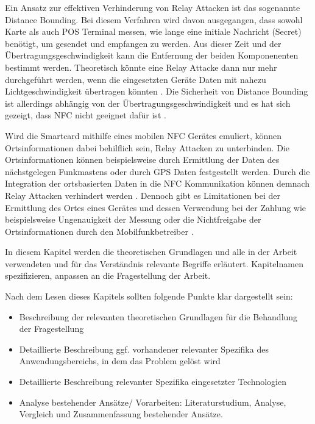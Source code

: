 Ein Ansatz zur effektiven Verhinderung von Relay Attacken ist das sogenannte Distance Bounding. Bei diesem Verfahren wird davon ausgegangen, dass sowohl Karte als auch POS Terminal messen, wie lange eine initiale Nachricht (Secret) benötigt, um gesendet und empfangen zu werden. Aus dieser Zeit und der Übertragungsgeschwindigkeit kann die Entfernung der beiden Komponenenten bestimmt werden. Theoretisch könnte eine Relay Attacke dann nur mehr durchgeführt werden, wenn die eingesetzten Geräte Daten mit nahezu Lichtgeschwindigkeit übertragen könnten \cite{nfcRelayWithOffTheShelfHardAndSoftware}. Die Sicherheit von Distance Bounding ist allerdings abhängig von der Übertragungsgeschwindigkeit und es hat sich gezeigt, dass NFC nicht geeignet dafür ist \cite{practicalNfcPeerToPeerRelayMobilePhones}. 

Wird die Smartcard mithilfe eines mobilen NFC Gerätes emuliert, können Ortsinformationen dabei behilflich sein, Relay Attacken zu unterbinden. Die Ortsinformationen können beispielsweise durch Ermittlung der Daten des nächstgelegen Funkmastens oder durch GPS Daten festgestellt werden. Durch die Integration der ortsbasierten Daten in die NFC Kommunikation können demnach Relay Attacken verhindert werden \cite{practicalNfcPeerToPeerRelayMobilePhones}. Dennoch gibt es Limitationen bei der Ermittlung des Ortes eines Gerätes und dessen Verwendung bei der Zahlung wie beispielsweise Ungenauigkeit der Messung oder die Nichtfreigabe der Ortsinformationen durch den Mobilfunkbetreiber \cite{practicalNfcPeerToPeerRelayMobilePhones}. 

\newpage

In diesem Kapitel werden die theoretischen Grundlagen und alle in der Arbeit verwendeten und für das Verständnis relevante Begriffe erläutert. Kapitelnamen spezifizieren, anpassen an die Fragestellung der Arbeit.

\makeatletter\ifthesis@masterthesis
Nach dem Lesen dieses Kapitels sollten folgende Punkte klar dargestellt sein:
\begin{itemize}
	\item Beschreibung der relevanten theoretischen Grundlagen für die Behandlung der Fragestellung
	\item Detaillierte Beschreibung ggf. vorhandener relevanter Spezifika des Anwendungsbereichs, in dem das Problem gelöst wird
	\item Detaillierte Beschreibung relevanter Spezifika eingesetzter Technologien
	\item Analyse bestehender Ansätze/ Vorarbeiten: Literaturstudium, Analyse, Vergleich und Zusammenfassung bestehender Ansätze.
\end{itemize}
\fi\makeatother

